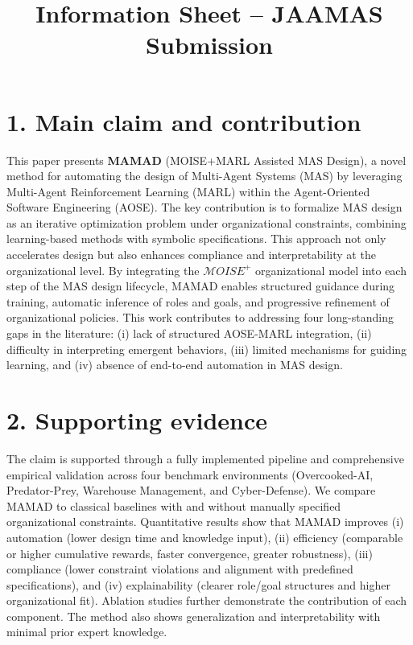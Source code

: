 \documentclass[11pt]{article}
\title{Information Sheet -- JAAMAS Submission}
\date{}
\begin{document}
\maketitle

\section*{1. Main claim and contribution}

This paper presents \textbf{MAMAD} (MOISE+MARL Assisted MAS Design), a novel method for automating the design of Multi-Agent Systems (MAS) by leveraging Multi-Agent Reinforcement Learning (MARL) within the Agent-Oriented Software Engineering (AOSE). The key contribution is to formalize MAS design as an iterative optimization problem under organizational constraints, combining learning-based methods with symbolic specifications. This approach not only accelerates design but also enhances compliance and interpretability at the organizational level. By integrating the $\mathcal{M}OISE^+$ organizational model into each step of the MAS design lifecycle, MAMAD enables structured guidance during training, automatic inference of roles and goals, and progressive refinement of organizational policies. This work contributes to addressing four long-standing gaps in the literature: (i) lack of structured AOSE-MARL integration, (ii) difficulty in interpreting emergent behaviors, (iii) limited mechanisms for guiding learning, and (iv) absence of end-to-end automation in MAS design.

\section*{2. Supporting evidence}

The claim is supported through a fully implemented pipeline and comprehensive empirical validation across four benchmark environments (Overcooked-AI, Predator-Prey, Warehouse Management, and Cyber-Defense). We compare MAMAD to classical baselines with and without manually specified organizational constraints. Quantitative results show that MAMAD improves (i) automation (lower design time and knowledge input), (ii) efficiency (comparable or higher cumulative rewards, faster convergence, greater robustness), (iii) compliance (lower constraint violations and alignment with predefined specifications), and (iv) explainability (clearer role/goal structures and higher organizational fit). Ablation studies further demonstrate the contribution of each component. The method also shows generalization and interpretability with minimal prior expert knowledge.
\end{document}
